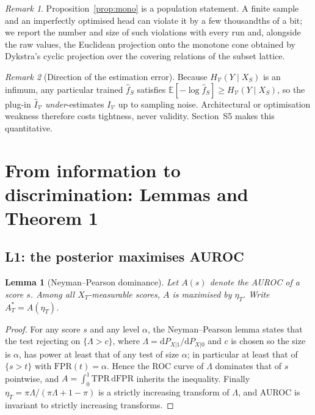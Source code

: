 \documentclass[11pt]{article}
\newtheorem{lemma}{Lemma}
\theoremstyle{definition}
\theoremstyle{remark}
\newtheorem{remark}{Remark}
\newcommand{\Vc}{\mathcal{V}}
\newcommand{\IV}{I_{\Vc}}
\newcommand{\HV}{H_{\Vc}}
\newcommand{\E}{\mathbb{E}}
\begin{document}
\begin{remark}
Proposition~\ref{prop:mono} is a population statement. A finite sample and an
imperfectly optimised head can violate it by a few thousandths of a bit; we
report the number and size of such violations with every run and, alongside the
raw values, the Euclidean projection onto the monotone cone obtained by Dykstra's
cyclic projection over the covering relations of the subset lattice.
\end{remark}

\begin{remark}[Direction of the estimation error]
\label{rem:lowerbound}
Because $\HV(Y\mid X_S)$ is an infimum, any particular trained $\hat f_S$
satisfies $\E[-\log \hat f_S]\ge \HV(Y\mid X_S)$, so the plug-in
$\hat\IV$ \emph{under}-estimates $\IV$ up to sampling noise. Architectural or
optimisation weakness therefore costs tightness, never validity. Section~S5
makes this quantitative.
\end{remark}

\section{From information to discrimination: Lemmas and Theorem 1}
\label{sec:s-lemmas}
\label{sec:thm1}

\subsection{L1: the posterior maximises AUROC}

\begin{lemma}[Neyman--Pearson dominance]
\label{lem:np}
Let $A(s)$ denote the AUROC of a score $s$. Among all $X_T$-measurable scores,
$A$ is maximised by $\eta_T$. Write $A^*_T=A(\eta_T)$.
\end{lemma}

\begin{proof}
For any score $s$ and any level $\alpha$, the Neyman--Pearson lemma states that
the test rejecting on $\{\Lambda>c\}$, where $\Lambda=\mathrm{d}P_{X|1}/\mathrm{d}P_{X|0}$
and $c$ is chosen so the size is $\alpha$, has power at least that of any test
of size $\alpha$; in particular at least that of $\{s>t\}$ with
$\mathrm{FPR}(t)=\alpha$. Hence the ROC curve of $\Lambda$ dominates that of $s$
pointwise, and $A=\int_0^1\mathrm{TPR}\,\mathrm{d}\mathrm{FPR}$ inherits the
inequality. Finally $\eta_T=\pi\Lambda/(\pi\Lambda+1-\pi)$ is a strictly
increasing transform of $\Lambda$, and AUROC is invariant to strictly increasing
transforms.
\end{proof}
\end{document}
